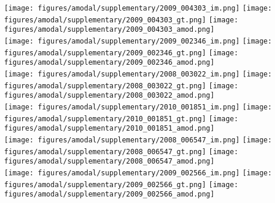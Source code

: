 \begin{figure*}
\centering\texttt{[image: figures/amodal/supplementary/2009\_004303\_im.png]}
\texttt{[image: figures/amodal/supplementary/2009\_004303\_gt.png]}
\texttt{[image: figures/amodal/supplementary/2009\_004303\_amod.png]} \\ 
\texttt{[image: figures/amodal/supplementary/2009\_002346\_im.png]}
\texttt{[image: figures/amodal/supplementary/2009\_002346\_gt.png]}
\texttt{[image: figures/amodal/supplementary/2009\_002346\_amod.png]} \\ 
\texttt{[image: figures/amodal/supplementary/2008\_003022\_im.png]}
\texttt{[image: figures/amodal/supplementary/2008\_003022\_gt.png]}
\texttt{[image: figures/amodal/supplementary/2008\_003022\_amod.png]} \\ 
\texttt{[image: figures/amodal/supplementary/2010\_001851\_im.png]}
\texttt{[image: figures/amodal/supplementary/2010\_001851\_gt.png]}
\texttt{[image: figures/amodal/supplementary/2010\_001851\_amod.png]} \\ 
\texttt{[image: figures/amodal/supplementary/2008\_006547\_im.png]}
\texttt{[image: figures/amodal/supplementary/2008\_006547\_gt.png]}
\texttt{[image: figures/amodal/supplementary/2008\_006547\_amod.png]} \\ 
\texttt{[image: figures/amodal/supplementary/2009\_002566\_im.png]}
\texttt{[image: figures/amodal/supplementary/2009\_002566\_gt.png]}
\texttt{[image: figures/amodal/supplementary/2009\_002566\_amod.png]} \\ 
\end{figure*}
